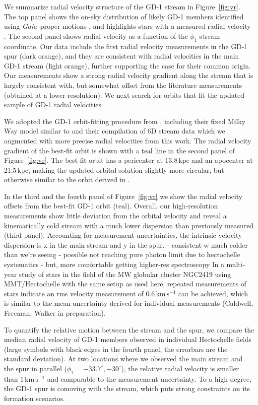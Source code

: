 \documentclass[twocolumn]{aastex63}
\newcommand{\gaia}{\textsl{Gaia}}
\newcommand{\kms}{\ensuremath{\textrm{km}\,\textrm{s}^{-1}}}
\begin{document}
We summarize radial velocity structure of the GD-1 stream in Figure~\ref{fig:vr}.
The top panel shows the on-sky distribution of likely GD-1 members identified using \gaia\ proper motions \citep[small points,][]{pwb}, and highlights stars with a measured radial velocity \citep[orange for this work, gray for literature data from][]{koposov2010}.
The second panel shows radial velocity as a function of the $\phi_1$ stream coordinate.
Our data include the first radial velocity measurements in the GD-1 spur (dark orange), and they are consistent with radial velocities in the main GD-1 stream (light orange), further supporting the case for their common origin.
Our measurements show a strong radial velocity gradient along the stream that is largely consistent with, but somewhat offset from the literature measurements (obtained at a lower-resolution).
We next search for orbits that fit the updated sample of GD-1 radial velocities.

We adopted the GD-1 orbit-fitting procedure from \citet{pwb}, including their fixed Milky Way model similar to \citet{bovy2015} and their compilation of 6D stream data which we augmented with more precise radial velocities from this work.
The radial velocity gradient of the best-fit orbit is shown with a teal line in the second panel of Figure~\ref{fig:vr}.
The best-fit orbit has a pericenter at 13.8\,kpc and an apocenter at 21.5\,kpc, making the updated orbital solution slightly more circular, but otherwise similar to the orbit derived in \citet{pwb}.

In the third and the fourth panel of Figure~\ref{fig:vr} we show the radial velocity offsets from the best-fit GD-1 orbit (teal).
Overall, our high-resolution measurements show little deviation from the orbital velocity and reveal a kinematically cold stream with a much lower dispersion than previously measured (third panel).
Accounting for measurement uncertainties, the intrinsic velocity dispersion is x in the main stream and y in the spur.
- consistent w much colder than we're seeing
- possible not reaching pure photon limit due to hectochelle systematics
- but, more comfortable getting higher-res spectroscopy
In a multi-year study of stars in the field of the MW globular cluster NGC2419 using MMT/Hectochelle with the same setup as used here, repeated measurements of stars indicate an rms velocity measurement of $0.6\,\kms$ can be achieved, which is similar to the mean uncertainty derived for individual measurements (Caldwell, Freeman, Walker in preparation).

To quantify the relative motion between the stream and the spur, we compare the median radial velocity of GD-1 members observed in individual Hectochelle fields (large symbols with black edges in the fourth panel, the errorbars are the standard deviation).
At two locations where we observed the main stream and the spur in parallel ($\phi_1=-33.7^\circ, -30^\circ$), the relative radial velocity is smaller than $1\,\kms$ and comparable to the measurement uncertainty.
To a high degree, the GD-1 spur is comoving with the stream, which puts strong constraints on its formation scenarios.
\end{document}

